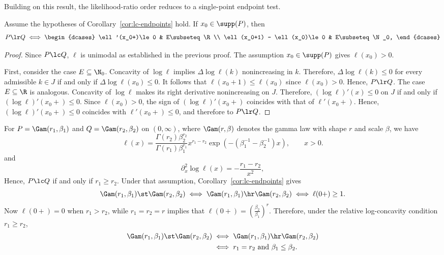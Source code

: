 \documentclass[11pt]{article}
\begin{document}
Building on this result, the likelihood-ratio order reduces to a single-point endpoint test.
\begin{cor}\label{cor:lc-lr}
Assume the hypotheses of Corollary~\ref{cor:lc-endpoints} hold. If  \(x_0\in\supp(P)\), then
\[
P\lr Q \iff
\begin{dcases}
\ell'(x_0+)\le 0 & E\subseteq\R \\
\ell(x_0+1) - \ell(x_0)\le 0 & E\subseteq\N_0,
\end{dcases}
\]
\end{cor}

\begin{proof}
Since \(P\lc Q\), \(\ell\) is unimodal as established in the previous proof. The assumption \(x_0\in\supp(P)\) gives \(\ell(x_0)>0\).

First, consider the case \(E\subseteq\N_0\). Concavity of \(\log\ell\) implies \(\Delta\log\ell(k)\) nonincreasing in \(k\). Therefore, \(\Delta\log\ell(k)\le 0\) for every admissible \(k\in J\) if and only if $\Delta\log\ell(x_0)\le 0.$ It follows that \(\ell(x_0+1)\le \ell(x_0)\) since \(\ell(x_0)>0\). Hence, \(P\lr Q\). The case \(E\subseteq\R\) is analogous. Concavity of \(\log\ell\) makes its right derivative nonincreasing on \(J\). Therefore, \((\log\ell)'(x)\le 0\) on \(J\) if and only if \((\log\ell)'(x_0+)\le 0\). Since \(\ell(x_0)>0\), the sign of  \((\log\ell)'(x_0+)\) coincides with that of \(\ell'(x_0+)\). Hence, \((\log\ell)'(x_0+)\le 0\) coincides with \(\ell'(x_0+)\le 0\), and therefore to \(P\lr Q\).
\end{proof}

\begin{example}
\label{ex:gamma-vs-gamma}
For \(P=\Gam(r_1,\beta_1)\) and \(Q=\Gam(r_2,\beta_2)\) on \((0,\infty)\), where \(\Gam(r,\beta)\) denotes the gamma law with shape \(r\) and scale \(\beta\), we have
\[
\ell(x)=\frac{\Gamma(r_2)\beta_2^{r_2}}{\Gamma(r_1)\beta_1^{r_1}} x^{r_1-r_2}\exp\!\left(-(\beta_1^{-1}-\beta_2^{-1})x\right),\qquad x>0.
\]
and
\[
\partial_x^2\log\ell(x)=-\frac{r_1-r_2}{x^2},
\]
Hence, \(P\lc Q\) if and only if \(r_1\ge r_2\). Under that assumption, Corollary~\ref{cor:lc-endpoints} gives
\[
\Gam(r_1,\beta_1)\st\Gam(r_2,\beta_2) \iff \Gam(r_1,\beta_1)\hr\Gam(r_2,\beta_2) \iff \ell(0+)\ge 1.
\]
Now \(\ell(0+)=0\) when \(r_1>r_2\), while \(r_1=r_2=r\) implies that  $\ell(0+)=\left(\frac{\beta_2}{\beta_1}\right)^r.$ Therefore, under the relative log-concavity condition \(r_1\ge r_2\),
\begin{align*}
\Gam(r_1,\beta_1)\st\Gam(r_2,\beta_2)
&\iff \Gam(r_1,\beta_1)\hr\Gam(r_2,\beta_2)\\
&\iff r_1=r_2\ \text{and}\ \beta_1\le \beta_2.
\end{align*}
\end{example}
\end{document}
